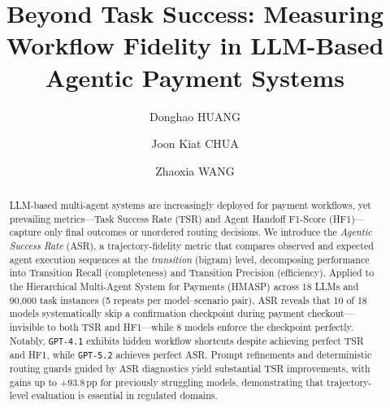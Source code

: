 \documentclass[runningheads]{llncs}
\begin{document}
\title{Beyond Task Success: Measuring Workflow Fidelity in LLM-Based Agentic Payment Systems}

\author{
Donghao HUANG 
\and
Joon Kiat CHUA 
\and
Zhaoxia WANG 
}

%
%

\maketitle

\begin{abstract}
LLM-based multi-agent systems are increasingly deployed for payment workflows, yet prevailing metrics---Task Success Rate (TSR) and Agent Handoff F1-Score (HF1)---capture only final outcomes or unordered routing decisions. We introduce the \emph{Agentic Success Rate} (ASR), a trajectory-fidelity metric that compares observed and expected agent execution sequences at the \emph{transition} (bigram) level, decomposing performance into Transition Recall (completeness) and Transition Precision (efficiency). Applied to the Hierarchical Multi-Agent System for Payments (HMASP) across 18 LLMs and 90{,}000 task instances (5 repeats per model--scenario pair), ASR reveals that 10 of 18 models systematically skip a confirmation checkpoint during payment checkout---invisible to both TSR and HF1---while 8 models enforce the checkpoint perfectly. Notably, \texttt{GPT-4.1} exhibits hidden workflow shortcuts despite achieving perfect TSR and HF1, while \texttt{GPT-5.2} achieves perfect ASR. Prompt refinements and deterministic routing guards guided by ASR diagnostics yield substantial TSR improvements, with gains up to +93.8\,pp for previously struggling models, demonstrating that trajectory-level evaluation is essential in regulated domains.

\end{abstract}
\end{document}
